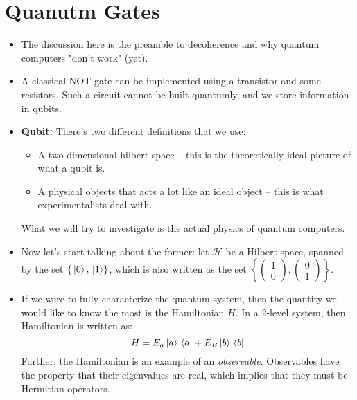 \section{Quanutm Gates}
\begin{itemize}
	\item The discussion here is the preamble to decoherence and why quantum computers 
		"don't work" (yet).
	\item A classical NOT gate can be implemented using a transistor and some resistors. Such a circuit cannot be 
		built quantumly, and we store information in qubits. 
	\item \textbf{Qubit:} There's two different definitions that we use:
		\begin{itemize}
			\item A two-dimensional hilbert space -- this is the theoretically ideal picture of what a qubit 
				is. 
			\item A physical objects that acts a lot like an ideal object -- this is what experimentalists deal with.
		\end{itemize}
		What we will try to investigate is the actual physics of quantum computers.  
	\item Now let's start talking about the former: let \( \mathcal H \) be a Hilbert space, spanned by 
		the set \( \{\ket*{0}, \ket*{1}\} \), which is also written as the set 
		\( \left \{\begin{pmatrix} 1\\0 \end{pmatrix}, 
		\begin{pmatrix} 0\\1 \end{pmatrix} \right\}  \). 
	\item If we were to fully characterize the quantum system, then the quantity we would like to know the most is the 
		Hamiltonian \( H \). In a 2-level system, then Hamiltonian is written as: 
		\[
		H = E_a \ket*{a}\bra*{a} + E_B \ket*{b}\bra*{b}
		\] 
		Further, the Hamiltonian is an example of an \textit{observable}. Observables have the property that 
		their eigenvalues are real, which implies that they must be Hermitian operators. 
\end{itemize}
